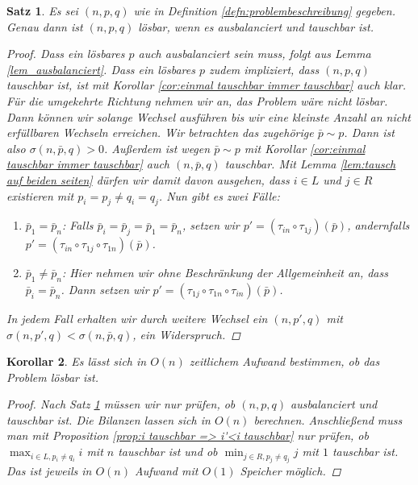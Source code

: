 \documentclass[12pt]{article}
\newtheorem{thm}{Satz} %
\newtheorem{cor}[thm]{Korollar}
\begin{document}
\begin{thm}
Es sei $(n, p, q)$ wie in Definition \ref{defn:problembeschreibung} gegeben. Genau dann ist $(n, p, q)$ lösbar, wenn es ausbalanciert und tauschbar ist.
\begin{proof}
Dass ein lösbares $p$ auch ausbalanciert sein muss, folgt aus Lemma \ref{lem_ausbalanciert}. Dass ein lösbares $p$ zudem impliziert, dass $(n, p, q)$ tauschbar ist, ist mit Korollar \ref{cor:einmal tauschbar immer tauschbar} auch klar. Für die umgekehrte Richtung nehmen wir an, das Problem wäre nicht lösbar. Dann können wir solange Wechsel ausführen bis wir eine kleinste Anzahl an nicht erfüllbaren Wechseln erreichen. Wir betrachten das zugehörige $\bar{p}\sim p$. Dann ist also $\sigma(n, \bar{p}, q)>0$. Außerdem ist wegen $\bar{p}\sim p$ mit Korollar \ref{cor:einmal tauschbar immer tauschbar} auch $(n, \bar{p}, q)$ tauschbar.
Mit Lemma \ref{lem:tausch auf beiden seiten} dürfen wir damit davon ausgehen, dass  $i\in L$ und $j\in R$ existieren mit $p_i=p_j\neq q_i=q_j$.
Nun gibt es zwei Fälle:
\begin{enumerate}
 \item $\bar{p}_1 = \bar{p}_n$: Falls $\bar{p}_i=\bar{p}_j=\bar{p}_1=\bar{p}_n$, setzen wir $p'=(\tau_{in}\circ\tau_{1j})(\bar{p})$, andernfalls $p'=(\tau_{in}\circ\tau_{1j}\circ\tau_{1n})(\bar{p})$.
 \item $\bar{p}_1 \neq \bar{p}_n$: Hier nehmen wir ohne Beschränkung der Allgemeinheit an, dass $\bar{p}_i=\bar{p}_n$. Dann setzen wir $p'=(\tau_{1j}\circ\tau_{1n}\circ\tau_{in})(\bar{p})$.
\end{enumerate}
In jedem Fall erhalten wir durch weitere Wechsel ein $(n, p', q)$ mit $\sigma(n, p', q)<\sigma(n, \bar{p}, q)$,  ein Widerspruch.
\end{proof}
\label{thm}
\end{thm}

\begin{cor}
Es lässt sich in $O(n)$ zeitlichem Aufwand bestimmen, ob das Problem lösbar ist.
\begin{proof}
Nach Satz \ref{thm} müssen wir nur prüfen, ob $(n, p, q)$ ausbalanciert und tauschbar ist.
Die Bilanzen lassen sich in $O(n)$ berechnen. Anschließend muss man mit Proposition \ref{prop:i tauschbar => i'<i tauschbar} nur prüfen, ob $\max_{i\in L, p_i\neq q_i} i$ mit $n$ tauschbar ist und  ob $\min_{j\in R, p_j\neq q_j} j$ mit $1$ tauschbar ist. Das ist jeweils in $O(n)$ Aufwand mit $O(1)$ Speicher möglich.
\end{proof}
\end{cor}
\end{document}
